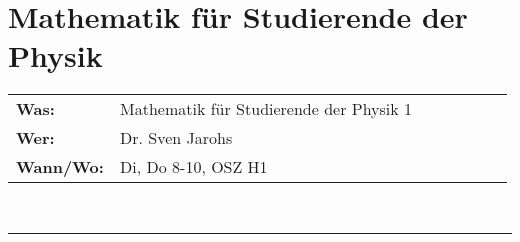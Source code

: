 \section{Mathematik f\"ur Studierende der Physik}

%
 
\begin{tabular}{p{0.2\linewidth}p{0.79\linewidth}}
  \textbf{Was:} & Mathematik f\"ur Studierende der Physik 1\\
  \textbf{Wer:} & Dr. Sven Jarohs\\
  \textbf{Wann/Wo:} & Di, Do 8-10, OSZ H1\\
\end{tabular}\\
\rule{\textwidth}{0.1pt}
\bigskip 
 
